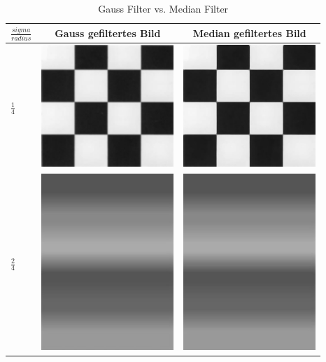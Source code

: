 \documentclass[12pt,german]{article}
\begin{document}
\begin{table}[H]
	\centering
	\begin{tabular}{| m{1cm} | c | c |}
    \hline
    $ \frac{sigma}{radius} $ & Gauss gefiltertes Bild & Median gefiltertes Bild \\
    \hline
    $ \frac{1}{4} $ &
    \centering \includegraphics[width=5cm]{../testData/Gauss/SchachbrettR4S2.jpg} &
     \includegraphics[width=5cm]{../testData/Median/SchachbrettR4.jpg} \\
     \hline
    $ \frac{2}{4} $ &
	\includegraphics[width=5cm]{../testData/Gauss/RegenbogenR4S2.jpg} & 	
	\includegraphics[width=5cm]{../testData/Median/RegenbogenR4.jpg} \\
	\hline
  \end{tabular}
  \caption{Gauss Filter vs. Median Filter}
  \label{tab:GaussMedianFilterEvaluierung}
\end{table}
\end{document}
